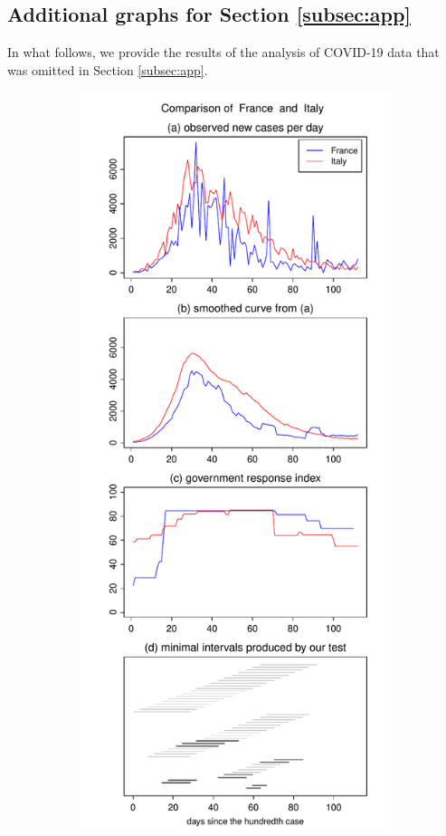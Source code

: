 \documentclass[a4paper,12pt]{article}
\numberwithin{equation}{section}
\begin{document}
\newpage
\subsection*{Additional graphs for Section \ref{subsec:app}}

In what follows, we provide the results of the analysis of COVID-19 data that was omitted in Section \ref{subsec:app}. 

\begin{figure}[t!]
\begin{subfigure}[b]{0.475\textwidth}
\includegraphics[width=\textwidth]{plots/FRA_vs_ITA}

\end{subfigure}
\end{figure}
\end{document}
